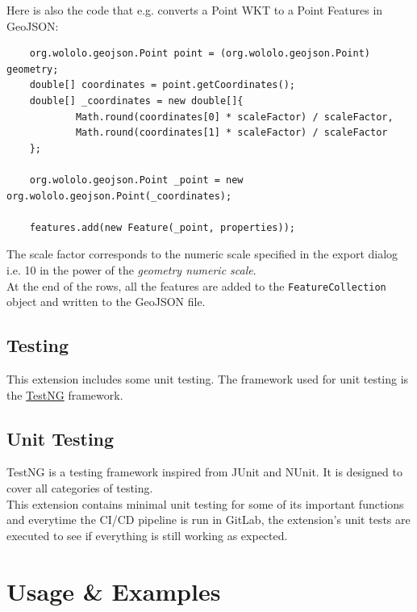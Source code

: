 Here is also the code that e.g. converts a Point WKT to a Point Features in GeoJSON:
\begin{verbatim}
    org.wololo.geojson.Point point = (org.wololo.geojson.Point) geometry;
    double[] coordinates = point.getCoordinates();
    double[] _coordinates = new double[]{
            Math.round(coordinates[0] * scaleFactor) / scaleFactor,
            Math.round(coordinates[1] * scaleFactor) / scaleFactor
    };

    org.wololo.geojson.Point _point = new org.wololo.geojson.Point(_coordinates);

    features.add(new Feature(_point, properties));
\end{verbatim}
The scale factor corresponds to the numeric scale specified in the export dialog i.e. 10 in the power of the \textit{geometry numeric scale}.\\
\newline
At the end of the rows, all the features are added to the \texttt{FeatureCollection} object and written to the GeoJSON file.
\subsection{Testing}
This extension includes some unit testing. The framework used for unit testing is the \href{https://testng.org/}{TestNG} framework.
\subsection{Unit Testing}
TestNG is a testing framework inspired from JUnit and NUnit. It is designed to cover all categories of testing.\\
This extension contains minimal unit testing for some of its important functions and everytime the CI/CD pipeline is run in GitLab, the
extension's unit tests are executed to see if everything is still working as expected.
\pagebreak
\section{Usage \& Examples}
